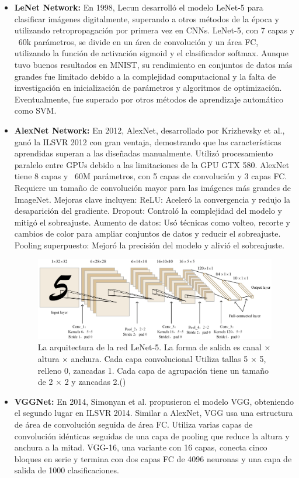 \begin{itemize}
	\item \textbf{LeNet Network:} En 1998, Lecun  desarrolló el modelo LeNet-5 para clasificar imágenes digitalmente, superando a otros métodos de la época y utilizando retropropagación por primera vez en CNNs. LeNet-5, con 7 capas y ~60k parámetros, se divide en un área de convolución y un área FC, utilizando la función de activación sigmoid y el clasificador softmax. Aunque tuvo buenos resultados en MNIST, su rendimiento en conjuntos de datos más grandes fue limitado debido a la complejidad computacional y la falta de investigación en inicialización de parámetros y algoritmos de optimización. Eventualmente, fue superado por otros métodos de aprendizaje automático como SVM.
	\item \textbf{AlexNet Network:} En 2012, AlexNet, desarrollado por Krizhevsky et al., ganó la ILSVR 2012 con gran ventaja, demostrando que las características aprendidas superan a las diseñadas manualmente. Utilizó procesamiento paralelo entre GPUs debido a las limitaciones de la GPU GTX 580. AlexNet tiene 8 capas y ~60M parámetros, con 5 capas de convolución y 3 capas FC. Requiere un tamaño de convolución mayor para las imágenes más grandes de ImageNet. Mejoras clave incluyen:
	ReLU: Aceleró la convergencia y redujo la desaparición del gradiente.
	Dropout: Controló la complejidad del modelo y mitigó el sobreajuste.
	Aumento de datos: Usó técnicas como volteo, recorte y cambios de color para ampliar conjuntos de datos y reducir el sobreajuste.
	Pooling superpuesto: Mejoró la precisión del modelo y alivió el sobreajuste.
	
	
	
	\begin{figure}[H]
		\begin{center}
			\includegraphics[width=1\textwidth]{2/figures/cnn3.jpeg}
			\caption{La arquitectura de la red LeNet-5. La forma de salida es canal × altura × anchura. Cada capa convolucional
				Utiliza tallas 5 × 5, relleno 0, zancadas 1. Cada capa de agrupación tiene un tamaño de 2 × 2 y zancadas 2.(\cite{tecnica2})}
		\end{center}
	\end{figure}
	\item \textbf{VGGNet:} En 2014, Simonyan et al. propusieron el modelo VGG, obteniendo el segundo lugar en ILSVR 2014. Similar a AlexNet, VGG usa una estructura de área de convolución seguida de área FC. Utiliza varias capas de convolución idénticas seguidas de una capa de pooling que reduce la altura y anchura a la mitad. VGG-16, una variante con 16 capas, conecta cinco bloques en serie y termina con dos capas FC de 4096 neuronas y una capa de salida de 1000 clasificaciones.
	

\end{itemize}
